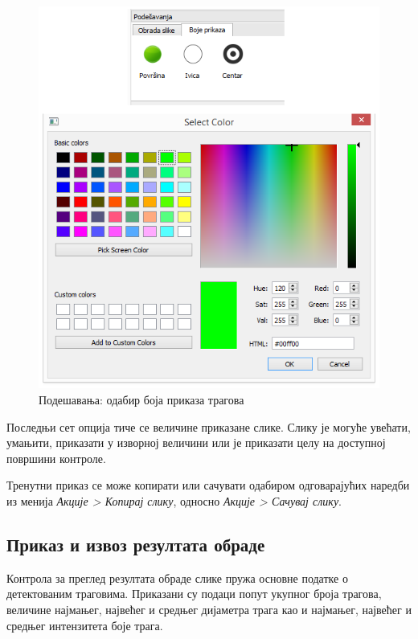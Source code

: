 \documentclass[12pt,a4paper,serbian,oneside]{book}
\begin{document}
\begin{figure}[H]
\begin{center}
\includegraphics[width=130mm]{images/colors.png}
\end{center}
\caption{Подешавања: одабир боја приказа трагова}
\label{fig:colors}
\end{figure}

Последњи сет опција тиче се величине приказане слике. Слику је могуће увећати, умањити, приказати у изворној величини или је приказати целу на доступној површини контроле.

Тренутни приказ се може копирати или сачувати одабиром одговарајућих наредби из менија \textit{Акције > Копирај слику}, односно \textit{Акције > Сачувај слику}.

\subsection{Приказ и извоз резултата обраде}

Контрола за преглед резултата обраде слике пружа основне податке о детектованим траговима. Приказани су подаци попут укупног броја трагова, величине најмањег, највећег и средњег дијаметра трага као и најмањег, највећег и средњег интензитета боје трага. 
\end{document}
